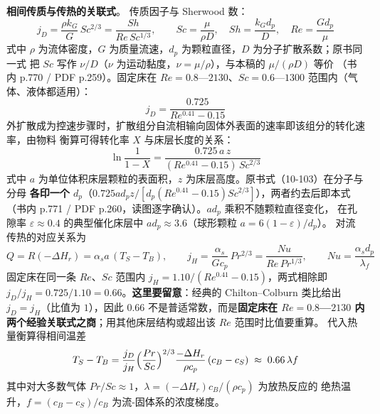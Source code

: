 \begin{principle}
\textbf{相间传质与传热的关联式}。
传质因子与 Sherwood 数：
\begin{equation}
j_D=\frac{\rho k_G}{G}\,Sc^{2/3}=\frac{Sh}{Re\,Sc^{1/3}},\qquad
Sc=\frac{\mu}{\rho D},\quad Sh=\frac{k_Gd_p}{D},\quad Re=\frac{Gd_p}{\mu}
\label{eq:ch10-jd}
\end{equation}
式中 $\rho$ 为流体密度，$G$ 为质量流速，$d_p$ 为颗粒直径，$D$ 为分子扩散系数；原书同一式
把 $Sc$ 写作 $\nu/D$（$\nu$ 为运动黏度，$\nu=\mu/\rho$），与本稿的 $\mu/(\rho D)$ 等价
（书内 p.770 / PDF p.259）。固定床在
$Re=0.8$—$2130$、$Sc=0.6$—$1300$ 范围内（气体、液体都适用）：
\begin{equation}
j_D=\frac{0.725}{Re^{0.41}-0.15}
\label{eq:ch10-jd-fix}
\end{equation}
外扩散成为控速步骤时，扩散组分自流相输向固体外表面的速率即该组分的转化速率，由物料
衡算可得转化率 $X$ 与床层长度的关系：
\begin{equation}
\ln\frac{1}{1-X}=\frac{0.725\,a\,z}{(Re^{0.41}-0.15)\,Sc^{2/3}}
\label{eq:ch10-extconv}
\end{equation}
式中 $a$ 为单位体积床层颗粒的表面积，$z$ 为床层高度。原书式（10-103）在分子与分母
\textbf{各印一个 $d_p$}（$0.725ad_pz/[d_p(Re^{0.41}-0.15)Sc^{2/3}]$），两者约去后即本式
（书内 p.771 / PDF p.260，读图逐字确认）。$ad_p$ 乘积不随颗粒直径变化，
在孔隙率 $\varepsilon\approx0.4$ 的典型催化床层中 $ad_p\approx3.6$（球形颗粒
$a=6(1-\varepsilon)/d_p$）。
对流传热的对应关系为
\begin{equation}
Q=R(-\Delta H_r)=\alpha_s a\,(T_S-T_B),\qquad
j_H=\frac{\alpha_s}{Gc_p}\,Pr^{2/3}=\frac{Nu}{Re\,Pr^{1/3}},\qquad
Nu=\frac{\alpha_s d_p}{\lambda_f}
\label{eq:ch10-jh}
\end{equation}
固定床在同一条 $Re$、$Sc$ 范围内 $j_H=1.10/(Re^{0.41}-0.15)$，两式相除即
$j_D/j_H=0.725/1.10=0.66$。\textbf{这里要留意}：经典的 Chilton--Colburn 类比给出
$j_D=j_H$（比值为 $1$），因此 $0.66$ 不是普适常数，而是\textbf{固定床在
$Re=0.8$—$2130$ 内两个经验关联式之商}；用其他床层结构或超出该 $Re$ 范围时比值要重算。
代入热量衡算得相间温差
\begin{equation}
T_S-T_B=\frac{j_D}{j_H}\Bigl(\frac{Pr}{Sc}\Bigr)^{2/3}
\frac{-\Delta H_r}{\rho c_p}\,(c_B-c_S)
\;\approx\;0.66\,\lambda f
\label{eq:ch10-dT}
\end{equation}
其中对大多数气体 $Pr/Sc\approx1$，$\lambda=(-\Delta H_r)c_B/(\rho c_p)$ 为放热反应的
绝热温升，$f=(c_B-c_S)/c_B$ 为流-固体系的浓度梯度。
\end{principle}

